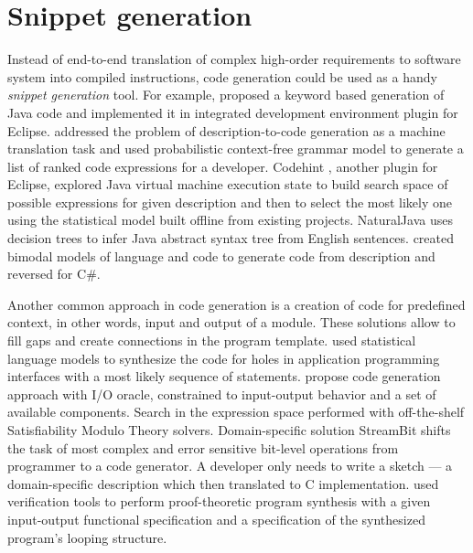 \section{Snippet generation}
Instead of end-to-end translation of complex high-order requirements to software system into compiled instructions, code generation could be used as a handy \emph{snippet generation} tool. For example, \cite{little2009keyword} proposed a keyword based generation of Java code and implemented it in integrated development environment plugin for Eclipse. \cite{Gvero2015} addressed the problem of description-to-code generation as a machine translation task and used probabilistic context-free grammar model to generate a list of ranked code expressions for a developer. Codehint \parencite{Galenson2014}, another plugin for Eclipse, explored Java virtual machine execution state to build search space of possible expressions for given description and then to select the most likely one using the statistical model built offline from existing projects. NaturalJava \parencite{Price2000} uses decision trees to infer Java abstract syntax tree from English sentences. \cite{pmlr-v37-allamanis15} created bimodal models of language and code to generate code from description and reversed for C\#.

Another common approach in code generation is a creation of code for predefined context, in other words, input and output of a module. These solutions allow to fill gaps and create connections in the program template. \cite{Raychev2014} used statistical language models to synthesize the code for holes in application programming interfaces with a most likely sequence of statements. \cite{Jha2010} propose code generation approach with I/O oracle, constrained to input-output behavior and a set of available components. Search in the expression space performed with off-the-shelf Satisfiability Modulo Theory solvers. Domain-specific solution StreamBit \parencite{Solar-Lezama2005} shifts the task of most complex and error sensitive bit-level operations from programmer to a code generator. A developer only needs to write a sketch --- a domain-specific description which then translated to C implementation. \cite{Srivastava2010} used verification tools to perform proof-theoretic program synthesis with a given input-output functional specification and a specification of the synthesized program’s looping structure.

